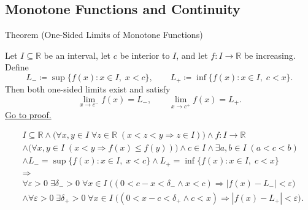 
\subsection*{Monotone Functions and Continuity}
\label{sec:monotone-functions}
\begin{theorembox}{Theorem (One-Sided Limits of Monotone Functions)}
\begin{theorem}
\label{thm:monotone-one-sided-limits}
Let $I \subseteq \mathbb{R}$ be an interval, let $c$ be interior to $I$, and let $f:I\to\mathbb{R}$ be increasing. Define
\[
L_- \coloneqq \sup\{f(x): x\in I,\; x<c\},
\qquad
L_+ \coloneqq \inf\{f(x): x\in I,\; c<x\}.
\]
Then both one-sided limits exist and satisfy
\[
\lim_{x\to c^-} f(x) = L_-,
\qquad
\lim_{x\to c^+} f(x) = L_+.
\]
\hyperref[prf:monotone-one-sided-limits]{Go to proof.}
\end{theorem}
\end{theorembox}

\begin{remark*}
\[
\begin{aligned}
&I\subseteq\mathbb{R}\land
\bigl(\forall x,y\in I\;\forall z\in\mathbb{R}\;(x<z<y\Rightarrow z\in I)\bigr)
\land f:I\to\mathbb{R}\\
&\land\bigl(\forall x,y\in I\;(x<y\Rightarrow f(x)\le f(y))\bigr)
\land c\in I
\land \exists a,b\in I\;(a<c<b)\\
&\land L_- = \sup\{f(x): x\in I,\; x<c\}
\land L_+ = \inf\{f(x): x\in I,\; c<x\}\\
&\Longrightarrow\\
&\forall \varepsilon>0\; \exists \delta_- > 0\; \forall x\in I\; \bigl((0<c-x<\delta_- \land x<c) \Rightarrow |f(x)-L_-|<\varepsilon \bigr)\\
&\land \forall \varepsilon>0\; \exists \delta_+ > 0\; \forall x\in I\; \bigl((0<x-c<\delta_+ \land c<x) \Rightarrow |f(x)-L_+|<\varepsilon \bigr).
\end{aligned}
\]
\end{remark*}

